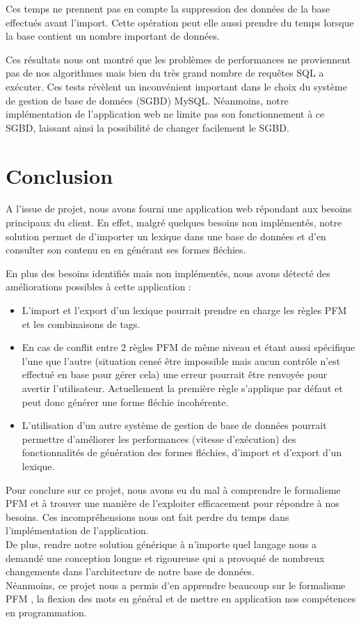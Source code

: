 \documentclass[12pt,a4paper]{article}
\begin{document}
\smallbreak
Ces temps ne prennent pas en compte la suppression des données de la base effectués avant l'import. Cette opération peut elle aussi prendre du temps lorsque la base contient un nombre important de données.

\smallbreak

Ces résultats nous ont montré que les problèmes de performances ne proviennent pas de nos algorithmes mais bien du très grand nombre de requêtes SQL a exécuter.
Ces tests révèlent un inconvénient important dans le choix du système de gestion de base de données (SGBD) MySQL.
Néanmoins, notre implémentation de l'application web ne limite pas son fonctionnement à ce SGBD, laissant ainsi la possibilité de changer facilement le SGBD.

\newpage
\section{Conclusion}
\setlength{\parindent}{1cm}

A l'issue de projet, nous avons fourni une application web répondant aux besoins principaux du client. 
En effet, malgré quelques besoins non implémentés, notre solution permet de d'importer un lexique dans une base de données et d'en consulter son contenu en en générant ses formes fléchies.

\smallbreak

\noindent En plus des besoins identifiés mais non implémentés, nous avons détecté des améliorations possibles à cette application :
\begin{itemize}
  \item L'import et l'export d'un lexique pourrait prendre en charge les règles PFM et les combinaisons de tags.
  \item En cas de conflit entre 2 règles PFM de même niveau et étant aussi spécifique l'une que l'autre (situation censé être impossible mais aucun contrôle n'est effectué en base pour gérer cela) une erreur pourrait être renvoyée pour avertir l'utilisateur. Actuellement la première règle s'applique par défaut et peut donc générer une forme fléchie incohérente.
  \item L'utilisation d'un autre système de gestion de base de données pourrait permettre d'améliorer les performances (vitesse d'exécution) des fonctionnalités de génération des formes fléchies, d'import et d'export d'un lexique.
\end{itemize}

\smallbreak

Pour conclure sur ce projet, nous avons eu du mal à comprendre le formalisme PFM et à trouver une manière de l'exploiter efficacement pour répondre à nos besoins. Ces incompréhensions nous ont fait perdre du temps dans l'implémentation de l'application. \\
\noindent De plus, rendre notre solution générique à n'importe quel langage nous a demandé une conception longue et rigoureuse qui a provoqué de nombreux changements dans l'architecture de notre base de données. \\
\noindent Néanmoins, ce projet nous a permis d'en apprendre beaucoup sur le formalisme PFM , la flexion des mots en général et de mettre en application nos compétences en programmation.

\newpage


\end{document}
